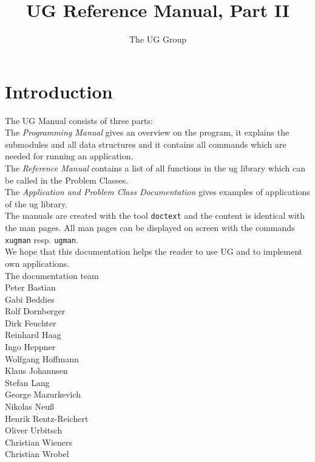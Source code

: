 


\pagestyle{myheadings}
\sloppy
\makeindex




\newcommand{\sectitle}{\mbox{}}
\setcounter{page}{0}

\title{UG Reference Manual, Part II}
\author{The UG Group}
\maketitle



\section*{Introduction}

The UG Manual consists of three parts:
\\[5mm]  
The {\em Programming Manual} gives an overview on the program, it
explains the submodules and all data structures and it contains
all commands which are needed for running an application.
\\[5mm]  
The {\em Reference Manual} contains a list of all 
functions in the ug library which can be called in the Problem Classes.
\\[5mm]
The {\em Application and Problem Class Documentation} gives examples
of applications of the ug library.
\\[5mm]
The manuals are created with the tool {\tt doctext} and the content is 
identical with the man pages. All man pages can be displayed on screen 
with the commands {\tt xugman} resp. {\tt ugman}.
\\[5mm]
We hope that this documentation helps the reader to use UG 
and to implement own applications.
\\[1cm]
The documentation team
\\[1cm]
Peter Bastian\\
Gabi Beddies\\
Rolf Dornberger\\
Dirk Feuchter\\
Reinhard Haag\\
Ingo Heppner\\
Wolfgang Hoffmann\\
Klaus Johannsen\\
Stefan Lang\\
George Mazurkevich\\
Nikolas Neu\ss\\
Henrik Rentz-Reichert\\
Oliver Urbitsch\\
Christian Wieners\\
Christian Wrobel

